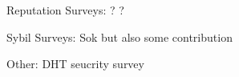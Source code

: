 Reputation Surveys:
\cite{marti2006taxonomy}
\cite{josang2007survey} ?
\cite{hoffman2009survey}
\cite{koutrouli2012taxonomy}
\cite{selvaraj2012survey} ?
\cite{hendrikx2015reputation}

Sybil Surveys:
\cite{levine2006survey}
\cite{mohaisen2013sybil}
\cite{rakesh2014survey}
\cite{gunturu2015survey}
\cite{koll2014state}
Sok\cite{alvisi2013sok} but also some contribution

Other:
\cite{wallach2003survey}
DHT seucrity survey\cite{urdaneta2011survey}

